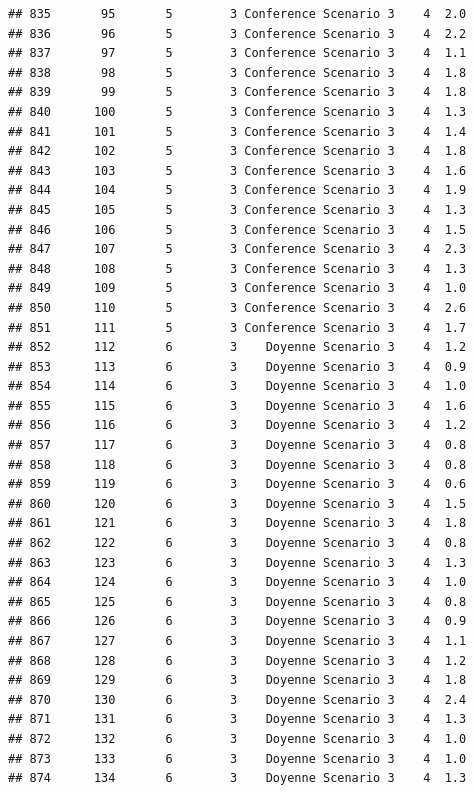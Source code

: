 \documentclass[
]{article}
\begin{document}
\begin{verbatim}
## 835       95       5        3 Conference Scenario 3    4  2.0
## 836       96       5        3 Conference Scenario 3    4  2.2
## 837       97       5        3 Conference Scenario 3    4  1.1
## 838       98       5        3 Conference Scenario 3    4  1.8
## 839       99       5        3 Conference Scenario 3    4  1.8
## 840      100       5        3 Conference Scenario 3    4  1.3
## 841      101       5        3 Conference Scenario 3    4  1.4
## 842      102       5        3 Conference Scenario 3    4  1.8
## 843      103       5        3 Conference Scenario 3    4  1.6
## 844      104       5        3 Conference Scenario 3    4  1.9
## 845      105       5        3 Conference Scenario 3    4  1.3
## 846      106       5        3 Conference Scenario 3    4  1.5
## 847      107       5        3 Conference Scenario 3    4  2.3
## 848      108       5        3 Conference Scenario 3    4  1.3
## 849      109       5        3 Conference Scenario 3    4  1.0
## 850      110       5        3 Conference Scenario 3    4  2.6
## 851      111       5        3 Conference Scenario 3    4  1.7
## 852      112       6        3    Doyenne Scenario 3    4  1.2
## 853      113       6        3    Doyenne Scenario 3    4  0.9
## 854      114       6        3    Doyenne Scenario 3    4  1.0
## 855      115       6        3    Doyenne Scenario 3    4  1.6
## 856      116       6        3    Doyenne Scenario 3    4  1.2
## 857      117       6        3    Doyenne Scenario 3    4  0.8
## 858      118       6        3    Doyenne Scenario 3    4  0.8
## 859      119       6        3    Doyenne Scenario 3    4  0.6
## 860      120       6        3    Doyenne Scenario 3    4  1.5
## 861      121       6        3    Doyenne Scenario 3    4  1.8
## 862      122       6        3    Doyenne Scenario 3    4  0.8
## 863      123       6        3    Doyenne Scenario 3    4  1.3
## 864      124       6        3    Doyenne Scenario 3    4  1.0
## 865      125       6        3    Doyenne Scenario 3    4  0.8
## 866      126       6        3    Doyenne Scenario 3    4  0.9
## 867      127       6        3    Doyenne Scenario 3    4  1.1
## 868      128       6        3    Doyenne Scenario 3    4  1.2
## 869      129       6        3    Doyenne Scenario 3    4  1.8
## 870      130       6        3    Doyenne Scenario 3    4  2.4
## 871      131       6        3    Doyenne Scenario 3    4  1.3
## 872      132       6        3    Doyenne Scenario 3    4  1.0
## 873      133       6        3    Doyenne Scenario 3    4  1.0
## 874      134       6        3    Doyenne Scenario 3    4  1.3

\end{verbatim}
\end{document}
